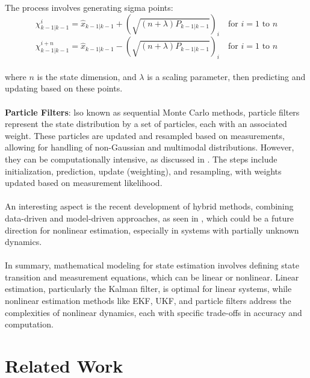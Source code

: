 The process involves generating sigma points:
\begin{equation}
    \chi_{k-1|k-1}^i = \hat{x}_{k-1|k-1} + \left( \sqrt{(n + \lambda) P_{k-1|k-1}} \right)_i \quad \text{for } i = 1 \text{ to } n
\end{equation}
\begin{equation}
    \chi_{k-1|k-1}^{i+n} = \hat{x}_{k-1|k-1} - \left( \sqrt{(n + \lambda) P_{k-1|k-1}} \right)_i \quad \text{for } i = 1 \text{ to } n
\end{equation}
\\
where $n$ is the state dimension, and $\lambda$ is a scaling parameter, then predicting and updating based on these points.
\\
\\
\textbf{Particle Filters}:
lso known as sequential Monte Carlo methods, particle filters represent the state distribution by a set of particles, each with an associated weight. These particles are updated and resampled based on measurements, allowing for handling of non-Gaussian and multimodal distributions. However, they can be computationally intensive, as discussed in \cite{PATWARDHAN2012933}. The steps include initialization, prediction, update (weighting), and resampling, with weights updated based on measurement likelihood. \cite{10.1007/978-981-33-6977-1_12}
\\
\\
An interesting aspect is the recent development of hybrid methods, combining data-driven and model-driven approaches, as seen in \cite{s21062085}, which could be a future direction for nonlinear estimation, especially in systems with partially unknown dynamics. 
\\
\\
In summary, mathematical modeling for state estimation involves defining state transition and measurement equations, which can be linear or nonlinear. Linear estimation, particularly the Kalman filter, is optimal for linear systems, while nonlinear estimation methods like EKF, UKF, and particle filters address the complexities of nonlinear dynamics, each with specific trade-offs in accuracy and computation.

\section{Related Work}

